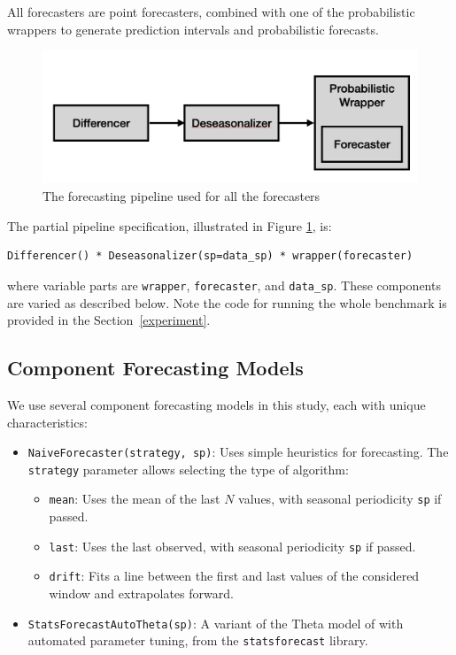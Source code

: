All forecasters are point forecasters, combined with one of the probabilistic wrappers to generate prediction intervals and probabilistic forecasts.

\begin{figure}
    \centering
    \includegraphics[width=\textwidth]{Figures/Pipeline.png}
    \caption{The forecasting pipeline used for all the forecasters}
    \label{fig:pipeline}
\end{figure}

The partial pipeline specification, illustrated in Figure \ref{fig:pipeline}, is:

\begin{verbatim}
Differencer() * Deseasonalizer(sp=data_sp) * wrapper(forecaster)
\end{verbatim}

where variable parts are \texttt{wrapper}, \texttt{forecaster}, and \texttt{data\_sp}. These components are varied as described below.
Note the code for running the whole benchmark is provided in the Section~\ref{experiment}.

\subsection{Component Forecasting Models}

We use several component forecasting models in this study, each with unique characteristics:

\begin{itemize}
    \item \texttt{NaiveForecaster(strategy, sp)}: Uses simple heuristics for forecasting. The \texttt{strategy} parameter allows selecting the type of algorithm:
    \begin{itemize}
        \item \texttt{mean}: Uses the mean of the last \(N\) values, with seasonal periodicity \texttt{sp} if passed.
        \item \texttt{last}: Uses the last observed, with seasonal periodicity \texttt{sp} if passed.
        \item \texttt{drift}: Fits a line between the first and last values of the considered window and extrapolates forward.
    \end{itemize}

    \item \texttt{StatsForecastAutoTheta(sp)}: A variant of the Theta model of \cite{Assimakopoulos2000} with automated parameter tuning, from the \texttt{statsforecast} library.
    
\end{itemize}

